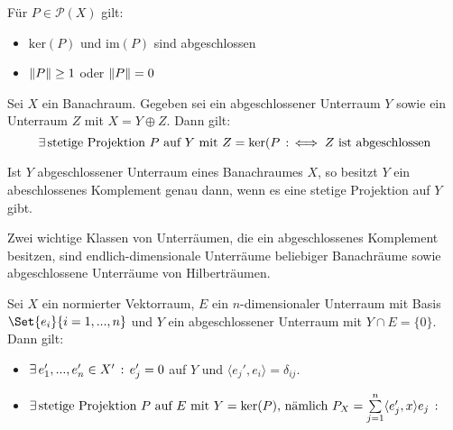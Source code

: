 \documentclass{cheat-sheet}
\begin{document}


\begin{lem}
  Für $P \in \mathcal{P}(X)$ gilt:
  \begin{itemize}
    \item $\mathrm{ker}(P)$ und $\mathrm{im}(P)$ sind abgeschlossen
    \item $\lVert P\rVert \geq 1$ oder $\lVert P\rVert = 0$
  \end{itemize}
\end{lem}

\begin{satz}
  Sei $X$ ein Banachraum. Gegeben sei ein abgeschlossener Unterraum $Y$ sowie ein Unterraum $Z$ mit $X = Y \oplus Z$. Dann gilt:
  \[ \exists \, {\text{stetige Projektion $P$ auf $Y$ mit $Z = \ker(P$}} \,:\, \iff Z \text{ ist abgeschlossen} \]
\end{satz}

\begin{bem}
  Ist $Y$ abgeschlossener Unterraum eines Banachraumes $X$, so besitzt $Y$ ein abeschlossenes Komplement genau dann, wenn es eine stetige Projektion auf $Y$ gibt.
\end{bem}

Zwei wichtige Klassen von Unterräumen, die ein abgeschlossenes Komplement besitzen, sind endlich-dimensionale Unterräume beliebiger Banachräume sowie abgeschlossene Unterräume von Hilberträumen.



\begin{satz}
  Sei $X$ ein normierter Vektorraum, $E$ ein $n$-dimensionaler Unterraum mit Basis $\Set{ e_i }{ i = 1, ..., n }$ und $Y$ ein abgeschlossener Unterraum mit $Y \cap E = \{ 0 \}$. Dann gilt:
  \begin{itemize}
    \item $\exists \, {e_1', ..., e_n' \in X'} \,:\, e_j' = 0$ auf $Y$ und $\langle e_j', e_i \rangle = \delta_{ij}$.
    \item $\ex{\text{stetige Projektion $P$ auf $E$ mit $Y = \ker (P)$, nämlich $P_X = \sum_{j=1}^n \langle e_j', x \rangle e_j$}}$
  \end{itemize}
\end{satz}
\end{document}
